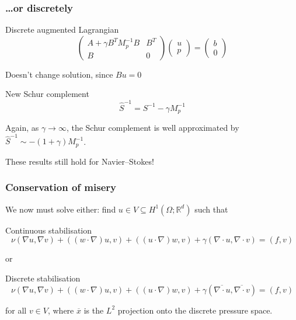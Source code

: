 \documentclass[presentation,aspectratio=43, 10pt]{beamer}
\newcommand{\honev}{\ensuremath{{H}^1(\Omega; \mathbb{R}^d)}\xspace}
\newcommand{\advect}[2]{\ensuremath{(#2 \cdot \nabla) #1}}
\begin{document}
\begin{frame}
  \frametitle{\dots or discretely}
  \begin{block}{Discrete augmented Lagrangian}
    \begin{equation*}
      \begin{pmatrix}
        A + \gamma B^T M_p^{-1} B & B^T \\
        B & 0
      \end{pmatrix}
      \begin{pmatrix}
        u \\ p
      \end{pmatrix}
      =
      \begin{pmatrix}
        b \\ 0
      \end{pmatrix}
    \end{equation*}
  \end{block}

  \pause  Doesn't change solution, since $B u = 0$

  \begin{block}{New Schur complement}
    \begin{equation*}
      \hat{S}^{-1} = S^{-1} - \gamma M_p^{-1}
    \end{equation*}

    Again, as $\gamma \to \infty$, the Schur complement is well
    approximated by $\hat{S}^{-1} \sim -(1 + \gamma)M_p^{-1}$.
  \end{block}

  \pause
  \begin{center}
    These results still hold for Navier--Stokes!
  \end{center}
\end{frame}
\begin{frame}
  \frametitle{Conservation of misery}
  We now must solve either: find $u \in V \subseteq \honev$ such that
  \begin{block}{Continuous stabilisation}
    \begin{equation*}
      \nu (\nabla u, \nabla v) + (\advect{u}{w}, v) + (\advect{w}{u}, v) 
      + \gamma(\nabla \cdot u, \nabla \cdot v) = (f, v)
    \end{equation*}
  \end{block}
  \vspace{-0.5\baselineskip}
  or 
  \begin{block}{Discrete stabilisation}
    \begin{equation*}
      \nu (\nabla u, \nabla v) + (\advect{u}{w}, v) + (\advect{w}{u}, v) 
      + \gamma(\overline{\nabla \cdot u}, \overline{\nabla \cdot v}) = (f, v)
  \end{equation*}
  \end{block}
  \vspace{-0.5\baselineskip}
  for all $v \in V$, where $\overline{x}$ is the $L^2$ projection onto
  the discrete pressure space.
\end{frame}
\end{document}
